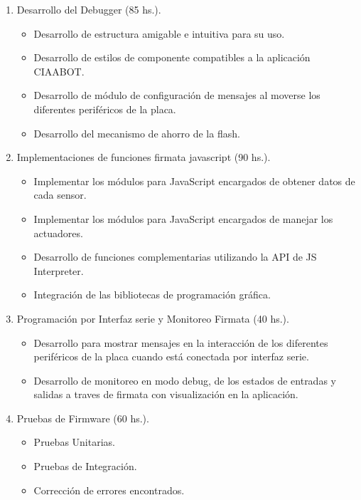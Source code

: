 \begin{enumerate}
	\item Desarrollo del Debugger (85 hs.).
	
	\begin{itemize}
		\item Desarrollo de estructura amigable e intuitiva para su uso.
		\item Desarrollo de estilos de componente compatibles a la aplicación CIAABOT.
		\item Desarrollo de módulo de configuración de mensajes al moverse los diferentes periféricos de la placa.
		\item Desarrollo del mecanismo de ahorro de la flash.
	\end{itemize}
	
	\item Implementaciones de funciones firmata javascript (90 hs.).
	
	\begin{itemize}
		\item Implementar los módulos para JavaScript encargados de obtener datos de cada sensor.
		\item Implementar los módulos para JavaScript encargados de manejar los actuadores.
		\item Desarrollo de funciones complementarias utilizando la API de JS Interpreter.
		\item Integración de las bibliotecas de programación gráfica.
	\end{itemize}

	\item Programación por Interfaz serie y Monitoreo Firmata (40 hs.).
	
	\begin{itemize}
		\item Desarrollo para mostrar mensajes en la interacción de los diferentes periféricos de la placa cuando está conectada por interfaz serie.
		\item Desarrollo de monitoreo en modo debug, de los estados de entradas y salidas a traves de firmata con visualización en la aplicación.
	\end{itemize}

	\item Pruebas de Firmware (60 hs.).
	
	\begin{itemize}
		\item Pruebas Unitarias.
		\item Pruebas de Integración.
		\item Corrección de errores encontrados.
	\end{itemize}


\end{enumerate}
